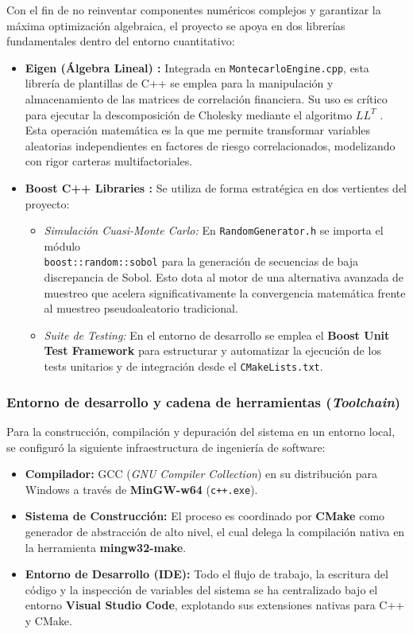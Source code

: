 \documentclass[11pt]{article}
\begin{document}
Con el fin de no reinventar componentes numéricos complejos y garantizar la máxima optimización algebraica, el proyecto se apoya en dos librerías fundamentales dentro del entorno cuantitativo:

\begin{itemize}
    \item \textbf{Eigen (Álgebra Lineal) \cite{eigenweb}:} Integrada en \texttt{MontecarloEngine.cpp}, esta librería de plantillas de C++ se emplea para la manipulación y almacenamiento de las matrices de correlación financiera. Su uso es crítico para ejecutar la descomposición de Cholesky mediante el algoritmo $LL^T$ \cite{higham2009cholesky} . Esta operación matemática es la que me permite transformar variables aleatorias independientes en factores de riesgo correlacionados, modelizando con rigor carteras multifactoriales.
    \item \textbf{Boost C++ Libraries \cite{boost_libraries}:} Se utiliza de forma estratégica en dos vertientes del proyecto:
    \begin{itemize}
        \item \textit{Simulación Cuasi-Monte Carlo:} En \texttt{RandomGenerator.h} se importa el módulo \\ \texttt{boost::random::sobol} para la generación de secuencias de baja discrepancia de Sobol. Esto dota al motor de una alternativa avanzada de muestreo que acelera significativamente la convergencia matemática frente al muestreo pseudoaleatorio tradicional.
        \item \textit{Suite de Testing:} En el entorno de desarrollo se emplea el \textbf{Boost Unit Test Framework} para estructurar y automatizar la ejecución de los tests unitarios y de integración desde el \texttt{CMakeLists.txt}.
    \end{itemize}
\end{itemize}





\subsubsection{Entorno de desarrollo y cadena de herramientas (\textit{Toolchain})}

Para la construcción, compilación y depuración del sistema en un entorno local, se configuró la siguiente infraestructura de ingeniería de software:
\begin{itemize}
    \item \textbf{Compilador:} GCC (\textit{GNU Compiler Collection}) en su distribución para Windows a través de \textbf{MinGW-w64} (\texttt{c++.exe}).
    \item \textbf{Sistema de Construcción:} El proceso es coordinado por \textbf{CMake} como generador de abstracción de alto nivel, el cual delega la compilación nativa en la herramienta \textbf{mingw32-make}.
    \item \textbf{Entorno de Desarrollo (IDE):} Todo el flujo de trabajo, la escritura del código y la inspección de variables del sistema se ha centralizado bajo el entorno \textbf{Visual Studio Code}, explotando sus extensiones nativas para C++ y CMake.
\end{itemize}
\end{document}
